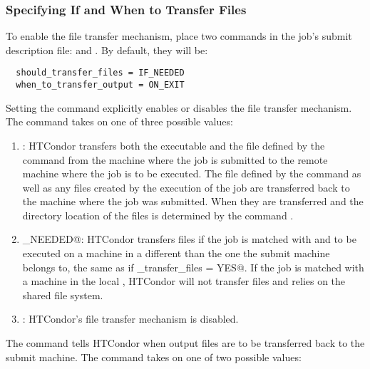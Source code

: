 \subsubsection{Specifying If and When to Transfer Files
\label{sec:file-transfer-if-when}}

To enable the file transfer mechanism, place two commands
in the job's submit description file:
 and .
By default, they will be:

\begin{verbatim}
  should_transfer_files = IF_NEEDED
  when_to_transfer_output = ON_EXIT
\end{verbatim}

Setting the  command explicitly
enables or disables the file transfer mechanism.
The command takes on one of three possible values:
\begin{enumerate}

\item \verb@YES@: HTCondor transfers both the executable and the file
defined by the  command from the machine where the job is
submitted to the remote machine where the job is to be executed.
The file defined by the  command as well as any files
created by the execution of the job are transferred back to the machine
where the job was submitted.
When they are transferred and the directory location of the files
is determined by the command .

\item \verb@IF_NEEDED@: HTCondor transfers files if the job is
matched with and to be executed on a machine in a
different  than the
one the submit machine belongs to, the same as if 
\verb@should_transfer_files = YES@.
If the job is matched with a machine in the local ,
HTCondor will not transfer files and relies
on the shared file system.

\item \verb@NO@: HTCondor's file transfer mechanism is disabled. 

\end{enumerate}

The  command tells HTCondor when output
files are to be transferred back to the submit machine.
The command takes on one of two possible values:

